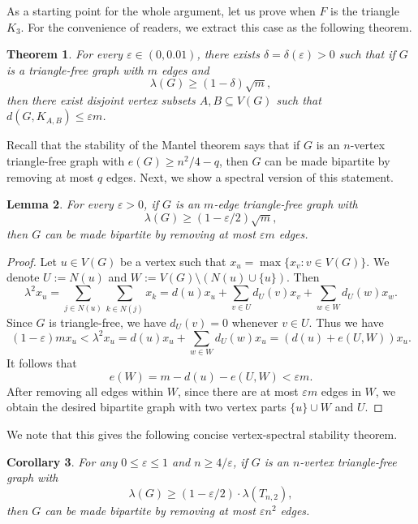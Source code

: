 \documentclass[11pt,a4paper]{article}
\newtheorem{theorem}{Theorem}[section]
\newtheorem{lemma}[theorem]{Lemma}
\newtheorem{cor}[theorem]{Corollary}
\theoremstyle{definition}
\theoremstyle{remark}
\begin{document}
As a starting point for the whole argument, let us prove  when $F$ is the triangle $K_3$. 
For the convenience of readers, we extract this case as the following theorem. 

\begin{theorem} \label{thm-stability-triangle}
    For every $\varepsilon\in (0,0.01)$, 
    there exists $\delta = \delta (\varepsilon) >0$ such that if $G$ is a triangle-free graph with $m$ edges and 
    \[ \lambda (G)\ge (1- \delta )\sqrt{m}, \] 
    then there exist disjoint vertex subsets $A,B \subseteq V(G)$ such that $d(G,K_{A,B})\le \varepsilon m$.
\end{theorem}

Recall that the stability of the Mantel theorem says that 
if $G$ is an $n$-vertex triangle-free graph with 
$e(G)\ge n^2/4 -q$, then 
$G$ can be made bipartite by removing at most $q$ edges. Next, we show a spectral version of this statement.  

\begin{lemma} \label{lem-bipartite}
For every $\varepsilon >0$, 
if $G$ is an $m$-edge triangle-free graph with
\[ \lambda (G) \ge 
(1- \varepsilon /2 ) \sqrt{m}, \] 
then $G$ can be made bipartite by removing at most 
$\varepsilon m$ edges. 
\end{lemma}

\begin{proof}  
Let $u\in V(G)$ be a vertex such that 
$x_u= \max\{x_v: v\in V(G)\}$. 
We denote $U:=N(u)$ and $W:=V(G)\setminus (N(u)\cup \{u\})$.  
Then 
\[  \lambda^2 x_u =\sum_{j\in N(u)} \sum_{k\in N(j)} x_k 
= d(u)x_u + \sum_{v\in U} d_U(v)x_v + 
\sum_{w\in W}d_U(w) x_w. \]
Since $G$ is triangle-free, we have $d_U(v) = 0$ whenever $v \in U$. Thus we have
$$(1- \varepsilon )mx_u < \lambda^2 x_u= d(u)x_u + \sum_{w\in W}d_U(w) x_u = (d(u) + e(U, W)) x_u.$$
It follows that 
$$e(W) = 
m- d(u) - e(U,W) <  \varepsilon m.$$ 
After removing all edges within 
$W$, since there are at most $\varepsilon m$ edges in $W$, we obtain the desired bipartite graph with two vertex parts $\{u\}\cup W$ and $U$.  
\end{proof}

We note that this gives the following concise vertex-spectral stability theorem.


\begin{cor}  \label{cor-bipartite-vertex-spectral}
For any $0\le \varepsilon \le 1$ and $n\ge 4/\varepsilon$, if $G$ is an $n$-vertex triangle-free graph with 
\[   \lambda (G) \ge 
(1- \varepsilon/2 )\cdot  \lambda (T_{n,2}), \]  then $G$ can be made bipartite by removing at most $\varepsilon n^2$ edges. 
\end{cor}
\end{document}
